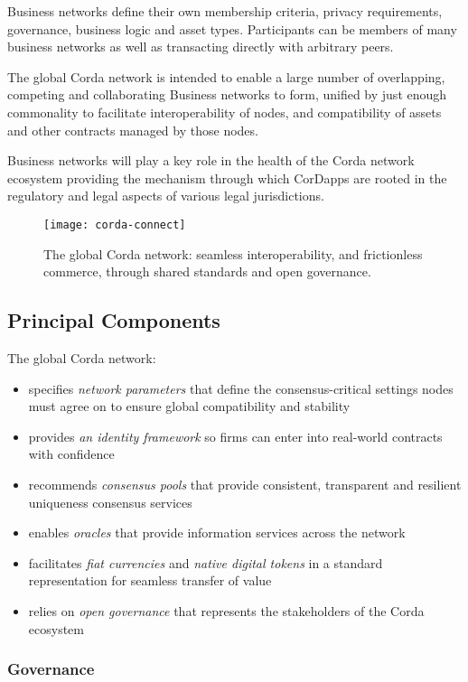 \documentclass{article}
\begin{document}
Business networks define their own membership criteria, privacy requirements, governance, business logic and asset types. Participants can be members of many business networks as well as transacting directly with arbitrary peers.

The global Corda network is intended to enable a large number of overlapping, competing and collaborating Business networks to form, unified by just enough commonality to facilitate interoperability of nodes, and compatibility of assets and other contracts managed by those nodes.

Business networks will play a key role in the health of the Corda network ecosystem providing the mechanism through which CorDapps are rooted in the regulatory and legal aspects of various legal jurisdictions.

\begin{figure}[H]
    \texttt{[image: corda-connect]}
    \caption{The global Corda network: seamless interoperability, and frictionless commerce, through shared standards and open governance.}
\end{figure}

\subsection{Principal Components}

The global Corda network:
\begin{itemize}
    \item specifies \textit{network parameters} that define the consensus-critical settings nodes must agree on to ensure global compatibility and stability
    \item provides \textit{an identity framework} so firms can enter into real-world contracts with confidence
    \item recommends \textit{consensus pools} that provide consistent, transparent and resilient uniqueness consensus services
    \item enables \textit{oracles} that provide information services across the network
    \item facilitates \textit{fiat currencies} and \textit{native digital tokens} in a standard representation for seamless transfer of value
    \item relies on \textit{open governance} that represents the stakeholders of the Corda ecosystem
\end{itemize}

\subsubsection{Governance}
\end{document}
